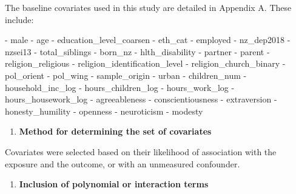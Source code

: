 \documentclass[
  singlecolumn]{report}
\newenvironment{Shaded}{\begin{snugshade}}{\end{snugshade}}
\newcommand{\NormalTok}[1]{\textcolor[rgb]{0.00,0.23,0.31}{#1}}
\newcommand{\SpecialStringTok}[1]{\textcolor[rgb]{0.13,0.47,0.30}{#1}}
\providecommand{\tightlist}{%
  \setlength{\itemsep}{0pt}\setlength{\parskip}{0pt}}\usepackage{longtable,booktabs,array}
\begin{document}
The baseline covariates used in this study are detailed in Appendix A.
These include:

\begin{Shaded}
\begin{Highlighting}[]
\SpecialStringTok{{-} }\NormalTok{male}
\SpecialStringTok{{-} }\NormalTok{age}
\SpecialStringTok{{-} }\NormalTok{education\_level\_coarsen}
\SpecialStringTok{{-} }\NormalTok{eth\_cat}
\SpecialStringTok{{-} }\NormalTok{employed}
\SpecialStringTok{{-} }\NormalTok{nz\_dep2018}
\SpecialStringTok{{-} }\NormalTok{nzsei13}
\SpecialStringTok{{-} }\NormalTok{total\_siblings}
\SpecialStringTok{{-} }\NormalTok{born\_nz}
\SpecialStringTok{{-} }\NormalTok{hlth\_disability}
\SpecialStringTok{{-} }\NormalTok{partner}
\SpecialStringTok{{-} }\NormalTok{parent}
\SpecialStringTok{{-} }\NormalTok{religion\_religious}
\SpecialStringTok{{-} }\NormalTok{religion\_identification\_level}
\SpecialStringTok{{-} }\NormalTok{religion\_church\_binary}
\SpecialStringTok{{-} }\NormalTok{pol\_orient}
\SpecialStringTok{{-} }\NormalTok{pol\_wing}
\SpecialStringTok{{-} }\NormalTok{sample\_origin}
\SpecialStringTok{{-} }\NormalTok{urban}
\SpecialStringTok{{-} }\NormalTok{children\_num}
\SpecialStringTok{{-} }\NormalTok{household\_inc\_log}
\SpecialStringTok{{-} }\NormalTok{hours\_children\_log}
\SpecialStringTok{{-} }\NormalTok{hours\_work\_log}
\SpecialStringTok{{-} }\NormalTok{hours\_housework\_log}
\SpecialStringTok{{-} }\NormalTok{agreeableness}
\SpecialStringTok{{-} }\NormalTok{conscientiousness}
\SpecialStringTok{{-} }\NormalTok{extraversion}
\SpecialStringTok{{-} }\NormalTok{honesty\_humility}
\SpecialStringTok{{-} }\NormalTok{openness}
\SpecialStringTok{{-} }\NormalTok{neuroticism}
\SpecialStringTok{{-} }\NormalTok{modesty}
\end{Highlighting}
\end{Shaded}

\begin{enumerate}
\def\labelenumi{\arabic{enumi}.}
\setcounter{enumi}{2}
\tightlist
\item
  \textbf{Method for determining the set of covariates}
\end{enumerate}

Covariates were selected based on their likelihood of association with
the exposure and the outcome, or with an unmeasured confounder.

\begin{enumerate}
\def\labelenumi{\arabic{enumi}.}
\setcounter{enumi}{3}
\tightlist
\item
  \textbf{Inclusion of polynomial or interaction terms}
\end{enumerate}
\end{document}
